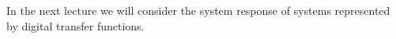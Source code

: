 \begin{slide}\label{slide:l9s15}
\end{slide}

\begin{slide}\label{slide:l9s16}
\end{slide}

In the next lecture we will consider the system response of
systems represented by digital transfer functions.



\endinput

